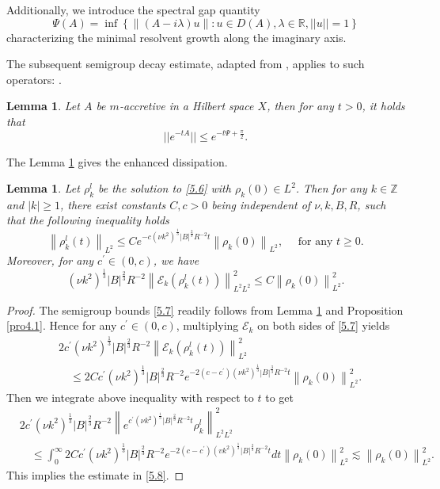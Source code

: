 \documentclass[final, 12pt,reqno]{amsart}
\newtheorem{lemma}[theorem]{\bf Lemma}
\numberwithin{equation}{section}
\begin{document}
Additionally, we introduce the spectral gap quantity
$$\Psi(A)=\inf\left\lbrace \|(A-i\lambda)u\|:u\in D(A),\lambda \in\mathbb{R},||u||=1\right\rbrace$$
characterizing the minimal resolvent growth along the imaginary axis.

The subsequent semigroup decay estimate, adapted from \cite{Wei.202101}, applies to such operators:
\cite{Wei.202101}.
\begin{lemma}\label{lem5.3}
    Let $A$ be $m$-accretive in a Hilbert space $X$, then for any
    $t>0$, it holds that
    $$||e^{-tA}||\leq e^{-t\Psi+\frac{\pi}{2}}.$$
\end{lemma}
The Lemma \ref{lem5.3} gives the enhanced dissipation.
\begin{lemma}\label{lem5.4}
Let $\rho_k^l$ be the solution to \eqref{5.6} with $\rho_k(0) \in L^2$. Then for any $k \in \mathbb{Z}$ and $|k| \geq 1$, there exist constants $C, c>0$ being independent of $\nu, k, B, R$, such that the following inequality holds
\begin{equation}\label{5.7}
    \left\|\rho_k^l(t)\right\|_{L^2} \leq C e^{-c\left(\nu k^2\right)^{\frac{1}{3}}|B|^{\frac{2}{3}} R^{-2} t}\left\|\rho_k(0)\right\|_{L^2}, \quad \text { for any } t \geq 0 .
\end{equation}
Moreover, for any $c^{\prime} \in(0, c)$, we have
\begin{equation}\label{5.8}
\left(\nu k^2\right)^{\frac{1}{3}}|B|^{\frac{2}{3}} R^{-2}\left\|\mathcal{E}_k (\rho_k^l(t))\right\|_{L^2 L^2}^2 \leq C\left\|\rho_k(0)\right\|_{L^2}^2 .
\end{equation}
\end{lemma}
\begin{proof}
The semigroup bounds \eqref{5.7} readily follows from Lemma \ref{lem5.3} and Proposition \ref{pro4.1}. Hence for any $c^{\prime} \in(0, c)$, multiplying $\mathcal{E}_k$ on both sides of \eqref{5.7} yields
     $$
\begin{aligned}
    & 2 c^{\prime}\left(\nu k^2\right)^{\frac{1}{3}}|B|^{\frac{2}{3}} R^{-2}\left\|\mathcal{E}_k (\rho_k^l(t))\right\|_{L^2}^2 \\
    & \quad \leq 2 C c^{\prime}\left(\nu k^2\right)^{\frac{1}{3}}|B|^{\frac{2}{3}} R^{-2} e^{-2\left(c-c^{\prime}\right)\left(\nu k^2\right)^{\frac{1}{3}}|B|^{\frac{3}{3}} R^{-2} t}\left\|\rho_k(0)\right\|_{L^2}^2 .
\end{aligned}
$$
Then we integrate above inequality with respect to $t$ to get
$$
\begin{aligned}
    & 2 c^{\prime}\left(\nu k^2\right)^{\frac{1}{3}}|B|^{\frac{2}{3}} R^{-2}\left\|e^{c^{\prime}\left(\nu k^2\right)^{\frac{1}{3}}|B|^{\frac{2}{3}} R^{-2} t} \rho_k^l\right\|_{L^2 L^2}^2 \\
    & \quad \leq \int_0^{\infty} 2 C c^{\prime}\left(\nu k^2\right)^{\frac{1}{3}}|B|^{\frac{2}{3}} R^{-2} e^{-2\left(c-c^{\prime}\right)\left(v k^2\right)^{\frac{1}{3}}|B|^{\frac{2}{3}} R^{-2} t} d t\left\|\rho_k(0)\right\|_{L^2}^2 \lesssim\left\|\rho_k(0)\right\|_{L^2}^2 .
\end{aligned}
$$
This implies the estimate in \eqref{5.8}.
\end{proof}
\end{document}

